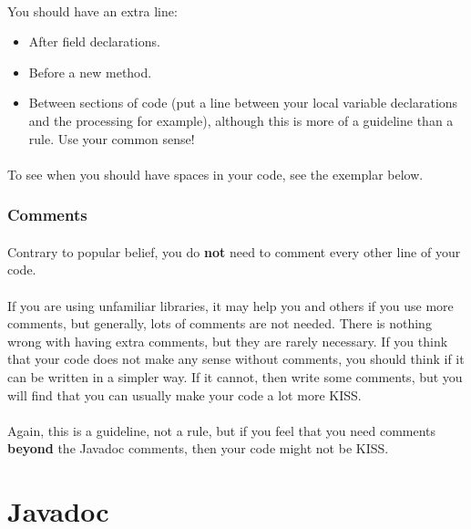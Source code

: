 \documentclass[12pt, letterpaper]{article}
\begin{document}
				\paragraph{}
					You should have an extra line:
					\begin{itemize}
						\item After field declarations.
						\item Before a new method.
						\item Between sections of code (put a line between your local variable declarations and the processing for example), although this is more of a guideline than a rule. Use your common sense!
					\end{itemize}
				\paragraph{}
					To see when you should have spaces in your code, see the exemplar below.
			\subsubsection{Comments}
				\paragraph{}
					Contrary to popular belief, you do \textbf{not} need to comment every other line of your code.
				\paragraph{}
					If you are using unfamiliar libraries, it may help you and others if you use more comments, but generally, lots of comments are not needed. There is nothing wrong with having extra comments, but they are rarely necessary. If you think that your code does not make any sense without comments, you should think if it can be written in a simpler way. If it cannot, then write some comments, but you will find that you can usually make your code a lot more KISS.
				\paragraph{}
					Again, this is a guideline, not a rule, but if you feel that you need comments \textbf{beyond} the Javadoc comments, then your code might not be KISS.
	\newpage
	\section{Javadoc}
\end{document}

